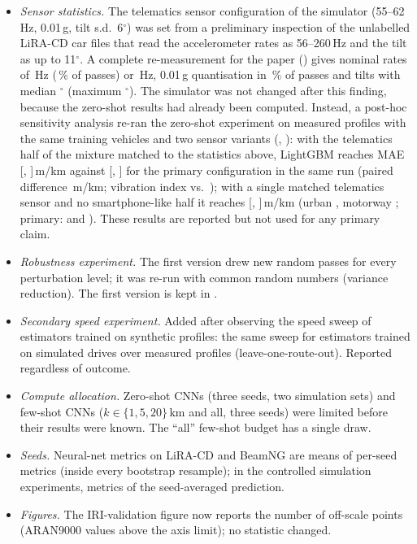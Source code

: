 \documentclass[onecolumn,10pt]{IEEEtran}
\begin{document}
\begin{itemize}
\item \emph{Sensor statistics.} The telematics sensor configuration of the simulator (55--62\,Hz, 0.01\,g, tilt s.d.\ 6$^\circ$) was set from a preliminary inspection of the unlabelled LiRA-CD car files that read the accelerometer rates as 56--260\,Hz and the tilt as up to 11$^\circ$. A complete re-measurement for the paper () gives nominal rates of \liraRateLow\,Hz (\liraRateLowShare\,\% of passes) or \liraRateHigh\,Hz, 0.01\,g quantisation in \liraLsbShare\,\% of passes and tilts with median \liraTiltMedian$^\circ$ (maximum \liraTiltMax$^\circ$). The simulator was not changed after this finding, because the zero-shot results had already been computed. Instead, a post-hoc sensitivity analysis re-ran the zero-shot experiment on measured profiles with the same training vehicles and two sensor variants (, ): with the telematics half of the mixture matched to the statistics above, LightGBM reaches MAE \phMixGbmMae{} [\phMixGbmMaeLo, \phMixGbmMaeHi]\,m/km against \phPrimGbmMae{} [\phPrimGbmMaeLo, \phPrimGbmMaeHi] for the primary configuration in the same run (paired difference \phMixGbmDmae\,m/km; vibration index \phMixPhysMae{} vs.\ \phPrimPhysMae); with a single matched telematics sensor and no smartphone-like half it reaches \phMeasGbmMae{} [\phMeasGbmMaeLo, \phMeasGbmMaeHi]\,m/km (urban \phMeasGbmMaeUrban, motorway \phMeasGbmMaeMotorway; primary: \phPrimGbmMaeUrban{} and \phPrimGbmMaeMotorway). These results are reported but not used for any primary claim.
\item \emph{Robustness experiment.} The first version drew new random passes for every perturbation level; it was re-run with common random numbers (variance reduction). The first version is kept in .
\item \emph{Secondary speed experiment.} Added after observing the speed sweep of estimators trained on synthetic profiles: the same sweep for estimators trained on simulated drives over measured profiles (leave-one-route-out). Reported regardless of outcome.
\item \emph{Compute allocation.} Zero-shot CNNs (three seeds, two simulation sets) and few-shot CNNs ($k\in\{1,5,20\}$\,km and all, three seeds) were limited before their results were known. The ``all'' few-shot budget has a single draw.
\item \emph{Seeds.} Neural-net metrics on LiRA-CD and BeamNG are means of per-seed metrics (inside every bootstrap resample); in the controlled simulation experiments, metrics of the seed-averaged prediction.
\item \emph{Figures.} The IRI-validation figure now reports the number of off-scale points (ARAN9000 values above the axis limit); no statistic changed.
\end{itemize}
\end{document}
